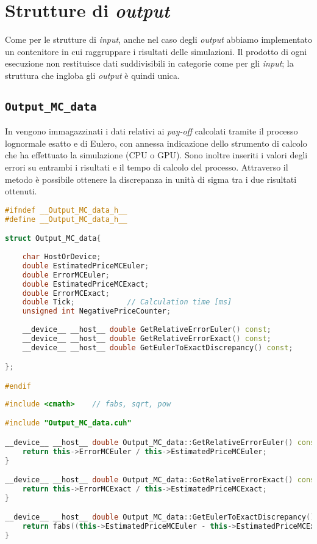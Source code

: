 \section{Strutture di \textit{output}}
Come per le strutture di \textit{input}, anche nel caso degli \textit{output} abbiamo implementato un contenitore in cui raggruppare i risultati delle simulazioni. Il prodotto di ogni esecuzione non restituisce dati suddivisibili in categorie come per gli \textit{input}; la struttura che ingloba gli \textit{output} è quindi unica.

\subsection{\texttt{Output\_MC\_data}}
In  vengono immagazzinati i dati relativi ai \textit{pay-off} calcolati tramite il processo lognormale esatto e di Eulero, con annessa indicazione dello strumento di calcolo che ha effettuato la simulazione (CPU o GPU). Sono inoltre inseriti i valori degli errori su entrambi i risultati e il tempo di calcolo del processo. Attraverso il metodo  è possibile ottenere la discrepanza in unità di sigma tra i due risultati ottenuti.

\begin{lstlisting}[language=C++, caption={\texttt{libraries/OutputStructures/OutputMCData/Output\_MC\_data.cuh}}]
#ifndef __Output_MC_data_h__
#define __Output_MC_data_h__

struct Output_MC_data{
	
	char HostOrDevice;
	double EstimatedPriceMCEuler;
	double ErrorMCEuler;
	double EstimatedPriceMCExact;
	double ErrorMCExact;
	double Tick;			// Calculation time [ms]
	unsigned int NegativePriceCounter;
	
	__device__ __host__ double GetRelativeErrorEuler() const;
	__device__ __host__ double GetRelativeErrorExact() const;
	__device__ __host__ double GetEulerToExactDiscrepancy() const;

};

#endif
\end{lstlisting}

\begin{lstlisting}[language=C++, caption={\texttt{libraries/OutputStructures/OutputMCData/Output\_MC\_data.cu}}]
#include <cmath>	// fabs, sqrt, pow

#include "Output_MC_data.cuh"

__device__ __host__ double Output_MC_data::GetRelativeErrorEuler() const{
	return this->ErrorMCEuler / this->EstimatedPriceMCEuler;
}

__device__ __host__ double Output_MC_data::GetRelativeErrorExact() const{
	return this->ErrorMCExact / this->EstimatedPriceMCExact;
}

__device__ __host__ double Output_MC_data::GetEulerToExactDiscrepancy() const{
	return fabs((this->EstimatedPriceMCEuler - this->EstimatedPriceMCExact)/sqrt(pow(this->ErrorMCEuler,2)+pow(ErrorMCExact,2)));
}
\end{lstlisting}

